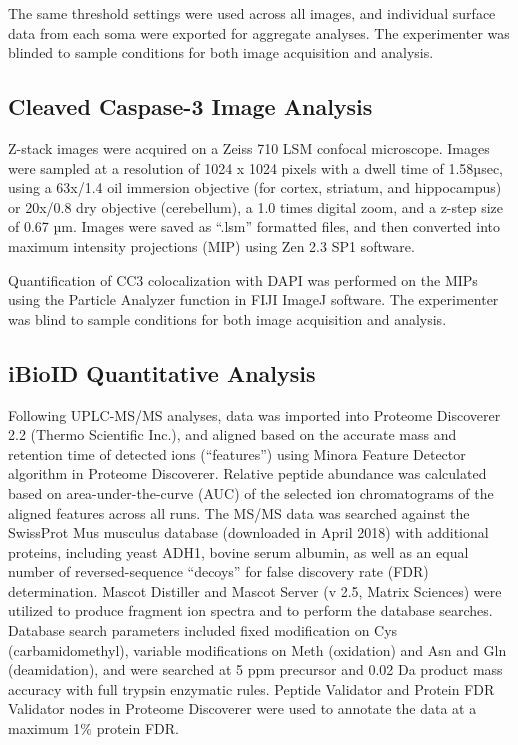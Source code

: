 The same threshold settings were used across all images, and individual surface
data from each soma were exported for aggregate analyses. The experimenter was
blinded to sample conditions for both image acquisition and analysis.

\subsection{Cleaved Caspase-3 Image Analysis}

Z-stack images were acquired on a Zeiss 710 LSM confocal microscope. Images were
sampled at a resolution of 1024 x 1024 pixels with a dwell time of 1.58µsec,
using a 63x/1.4 oil immersion objective (for cortex, striatum, and hippocampus)
or 20x/0.8 dry objective (cerebellum), a 1.0 times digital zoom, and a z-step
size of 0.67 µm. Images were saved as “.lsm” formatted files, and then converted
into maximum intensity projections (MIP) using Zen 2.3 SP1 software.

Quantification of CC3 colocalization with DAPI was performed on the MIPs using
the Particle Analyzer function in FIJI ImageJ software. The experimenter was
blind to sample conditions for both image acquisition and analysis.

\subsection{iBioID Quantitative Analysis}

Following UPLC-MS/MS analyses, data was imported into Proteome Discoverer 2.2
(Thermo Scientific Inc.), and aligned based on the accurate mass and retention
time of detected ions (“features”) using Minora Feature Detector algorithm in
Proteome Discoverer. Relative peptide abundance was calculated based on
area-under-the-curve (AUC) of the selected ion chromatograms of the aligned
features across all runs. The MS/MS data was searched against the SwissProt Mus
musculus database (downloaded in April 2018) with additional proteins, including
yeast ADH1, bovine serum albumin, as well as an equal number of
reversed-sequence “decoys” for false discovery rate (FDR) determination. Mascot
Distiller and Mascot Server (v 2.5, Matrix Sciences) were utilized to produce
fragment ion spectra and to perform the database searches. Database search
parameters included fixed modification on Cys (carbamidomethyl), variable
modifications on Meth (oxidation) and Asn and Gln (deamidation), and were
searched at 5 ppm precursor and 0.02 Da product mass accuracy with full trypsin
enzymatic rules. Peptide Validator and Protein FDR Validator nodes in Proteome
Discoverer were used to annotate the data at a maximum 1\% protein FDR.

